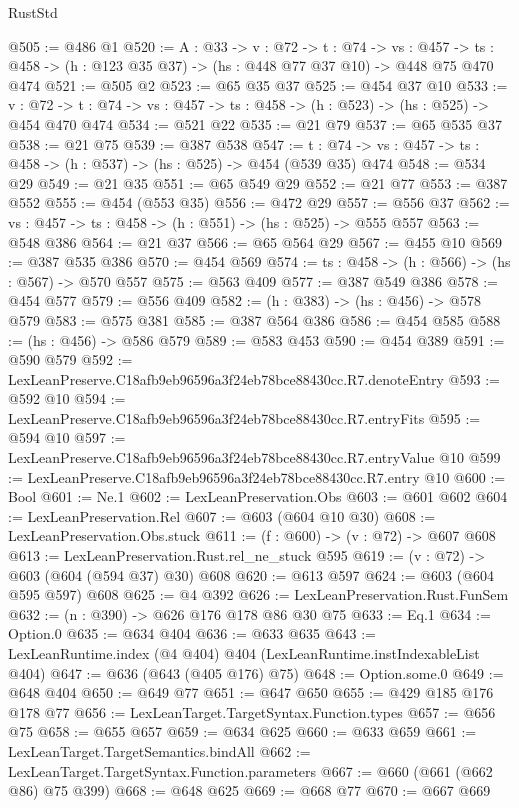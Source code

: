 \begin{lexlean}{RustStd}
\begin{coremodule}
@505 := @486 @1
@520 := {A : @33} ->
  {v : @72} ->
  {t : @74} ->
  {vs : @457} -> {ts : @458} -> (h : @123 @35 @37) -> (hs : @448 @77 @37 @10) -> @448 @75 @470 @474
@521 := @505 @2
@523 := @65 @35 @37
@525 := @454 @37 @10
@533 := {v : @72} ->
  {t : @74} -> {vs : @457} -> {ts : @458} -> (h : @523) -> (hs : @525) -> @454 @470 @474
@534 := @521 @22
@535 := @21 @79
@537 := @65 @535 @37
@538 := @21 @75
@539 := @387 @538
@547 := {t : @74} -> {vs : @457} -> {ts : @458} -> (h : @537) -> (hs : @525) -> @454 (@539 @35) @474
@548 := @534 @29
@549 := @21 @35
@551 := @65 @549 @29
@552 := @21 @77
@553 := @387 @552
@555 := @454 (@553 @35)
@556 := @472 @29
@557 := @556 @37
@562 := {vs : @457} -> {ts : @458} -> (h : @551) -> (hs : @525) -> @555 @557
@563 := @548 @386
@564 := @21 @37
@566 := @65 @564 @29
@567 := @455 @10
@569 := @387 @535 @386
@570 := @454 @569
@574 := {ts : @458} -> (h : @566) -> (hs : @567) -> @570 @557
@575 := @563 @409
@577 := @387 @549 @386
@578 := @454 @577
@579 := @556 @409
@582 := (h : @383) -> (hs : @456) -> @578 @579
@583 := @575 @381
@585 := @387 @564 @386
@586 := @454 @585
@588 := (hs : @456) -> @586 @579
@589 := @583 @453
@590 := @454 @389
@591 := @590 @579
@592 := LexLeanPreserve.C18afb9eb96596a3f24eb78bce88430cc.R7.denoteEntry
@593 := @592 @10
@594 := LexLeanPreserve.C18afb9eb96596a3f24eb78bce88430cc.R7.entryFits
@595 := @594 @10
@597 := LexLeanPreserve.C18afb9eb96596a3f24eb78bce88430cc.R7.entryValue @10
@599 := LexLeanPreserve.C18afb9eb96596a3f24eb78bce88430cc.R7.entry @10
@600 := Bool
@601 := Ne.{1}
@602 := LexLeanPreservation.Obs
@603 := @601 @602
@604 := LexLeanPreservation.Rel
@607 := @603 (@604 @10 @30)
@608 := LexLeanPreservation.Obs.stuck
@611 := (f : @600) -> (v : @72) -> @607 @608
@613 := LexLeanPreservation.Rust.rel_ne_stuck @595
@619 := (v : @72) -> @603 (@604 (@594 @37) @30) @608
@620 := @613 @597
@624 := @603 (@604 @595 @597) @608
@625 := @4 @392
@626 := LexLeanPreservation.Rust.FunSem
@632 := (n : @390) -> @626 @176 @178 @86 @30 @75
@633 := Eq.{1}
@634 := Option.{0}
@635 := @634 @404
@636 := @633 @635
@643 := LexLeanRuntime.index (@4 @404) @404 (LexLeanRuntime.instIndexableList @404)
@647 := @636 (@643 (@405 @176) @75)
@648 := Option.some.{0}
@649 := @648 @404
@650 := @649 @77
@651 := @647 @650
@655 := @429 @185 @176 @178 @77
@656 := LexLeanTarget.TargetSyntax.Function.types
@657 := @656 @75
@658 := @655 @657
@659 := @634 @625
@660 := @633 @659
@661 := LexLeanTarget.TargetSemantics.bindAll
@662 := LexLeanTarget.TargetSyntax.Function.parameters
@667 := @660 (@661 (@662 @86) @75 @399)
@668 := @648 @625
@669 := @668 @77
@670 := @667 @669

\end{coremodule}
\end{lexlean}
